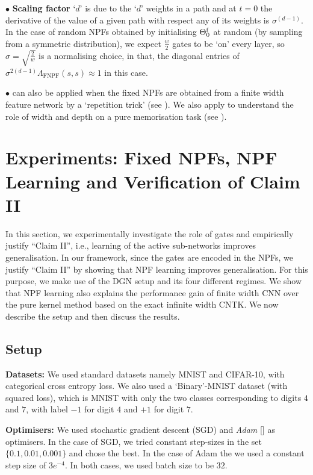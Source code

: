 \documentclass{article}
\begin{document}
 $\bullet$ \textbf{Scaling factor}  `$d$' is due to the `$d$' weights in a path and at $t=0$ the derivative of the value of a given path with respect any of its weights is $\sigma^{(d-1)}$. In the case of random NPFs obtained by initialising $\Theta^{\textrm{f}}_0$ at random (by sampling from a symmetric distribution), we expect $\frac{w}2$ gates to be `on' every layer, so $\sigma=\sqrt{\frac{2}{w}}$ is a normalising choice, in that, the diagonal entries of $\sigma^{2(d-1)}{\Lambda}_{\text{FNPF}}(s,s)\approx 1$ in this case.

$\bullet$  can also be applied when the fixed NPFs are obtained from a finite width feature network by a `repetition trick' (see ). We  also apply  to understand the role of width and depth on a pure memorisation task  (see ).

\section{Experiments: Fixed NPFs, NPF Learning and Verification of Claim II}\label{sec:experiments} 
In this section, we experimentally investigate the role of gates and empirically justify ``Claim II'', i.e., learning of the active sub-networks improves generalisation.  In our framework, since the gates are encoded in the NPFs, we justify ``Claim II'' by showing that NPF learning improves generalisation. For this purpose, we make use of the DGN setup and its four different regimes.  We show that NPF learning also explains the performance gain of finite width CNN over the pure kernel method based on the exact infinite width CNTK. We now describe the setup and then discuss the results.
\subsection{Setup}
\textbf{Datasets:} We used standard datasets namely MNIST and CIFAR-10, with categorical cross entropy loss. We also used a `Binary'-MNIST dataset (with squared loss), which is MNIST with only the two classes corresponding to digits $4$ and $7$, with label $-1$ for digit $4$ and $+1$ for digit $7$.

\textbf{Optimisers:} We used stochastic gradient descent (SGD) and \emph{Adam} [] as optimisers. In the case of SGD, we tried constant step-sizes in the set $\{0.1,0.01,0.001\}$ and chose the best. In the case of Adam the we used a constant step size of $3e^{-4}$. In both cases, we used batch size to be $32$.  
\end{document}
